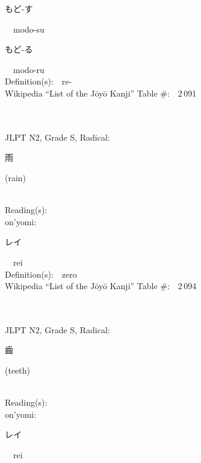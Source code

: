 \begin{multicols}{2}
{\hspace*{2em}}{\begin{CJK}{UTF8}{min} もど-す \end{CJK}}\ \ modo-su\ \ \\
{\hspace*{2em}}{\begin{CJK}{UTF8}{min} もど-る \end{CJK}}\ \ modo-ru\ \ \\
Definition(s):\ \ re- \\
Wikipedia ``List of the J\=oy\=o Kanji'' Table \#:\ \ 2\,091 \\
\ \ \\
{\fontsize{34pt}{40pt}  }\ \ \\  %
{JLPT N2, Grade S, Radical:\ \ {\begin{CJK}{UTF8}{min} 雨 \end{CJK}} (rain) } \\
Reading(s):\ \ \\
{\hspace*{1em}}on'yomi:\ \ \\
{\hspace*{2em}}{\begin{CJK}{UTF8}{min} レイ \end{CJK}}\ \ rei\ \ \\
Definition(s):\ \ zero \\
Wikipedia ``List of the J\=oy\=o Kanji'' Table \#:\ \ 2\,094 \\
\ \ \\
{\fontsize{34pt}{40pt}  }\ \ \\  %
{JLPT N2, Grade S, Radical:\ \ {\begin{CJK}{UTF8}{min} 齒 \end{CJK}} (teeth) } \\
Reading(s):\ \ \\
{\hspace*{1em}}on'yomi:\ \ \\
{\hspace*{2em}}{\begin{CJK}{UTF8}{min} レイ \end{CJK}}\ \ rei\ \ \\

\end{multicols}
